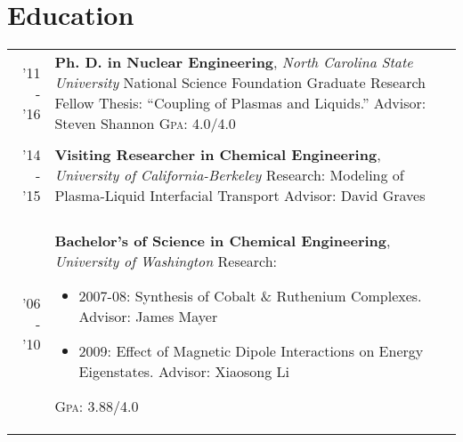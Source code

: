 \documentclass[a4paper,10pt]{article} %
\begin{document}
\section{Education}

\begin{table}[H]
\begin{tabularx}{\textwidth}{r>{\raggedright\arraybackslash}X}

  \textsc{'11 - '16} & \textbf{Ph. D. in Nuclear Engineering}, \textit{North Carolina State University}\newline
  National Science Foundation Graduate Research Fellow\newline
  Thesis: ``Coupling of Plasmas and Liquids.''\newline
  Advisor: Steven Shannon\newline
  \textsc{Gpa}: 4.0/4.0\\
&\\


  \textsc{'14 - '15} & \textbf{Visiting Researcher in Chemical Engineering}, \textit{University of California-Berkeley}\newline
  Research: Modeling of Plasma-Liquid Interfacial Transport\newline
  Advisor: David Graves\\
&\\


  \textsc{'06 - '10} & \textbf{Bachelor's of Science in Chemical Engineering}, \textit{University of Washington}\newline
  Research:
  \begin{itemize}
  \item 2007-08: Synthesis of Cobalt \& Ruthenium Complexes. Advisor: James Mayer
  \item 2009: Effect of Magnetic Dipole Interactions on Energy Eigenstates. Advisor: Xiaosong Li
  \end{itemize}
  \textsc{Gpa}: 3.88/4.0\\

\end{tabularx}
\end{table}

\pagebreak
\end{document}
